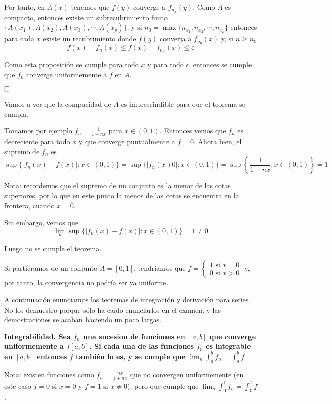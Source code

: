 \documentclass[a4paper]{article}
\newcommand{\qed}{\begin{flushright}
		{$\newline\square$}
	\end{flushright}}
\begin{document}
Por tanto, en $A(x)$ tenemos que $f(y)$ converge a $f_{n_x}(y)$. Como $A$ es compacto, entonces existe un subrecubrimiento finito $\{A(x_1), A(x_2), A(x_3),\cdots , A(x_p) \}$, y si $n_0 = \max\{ n_{x_1},n_{x_2},\cdots,n_{x_p} \}$ entonces para cada $x$ existe un recubrimiento donde $f(y)$ converja a $f_{n_0}(x)$ y, si $n\ge n_0$
$$f(x)-f_n(x) \le f(x)-f_{n_0}(x) \le \varepsilon$$

Como esta proposición se cumple para todo $x$ y para todo $\epsilon$, entonces se cumple que $f_n$ converge uniformemente a $f$ en $A$.
\qed


Vamos a ver que la compacidad de $A$ es imprescindible para que el teorema se cumpla.

Tomamos por ejemplo $f_n = \frac{1}{1+nx}$ para $x\in(0,1)$. Entonces vemos que $f_n$ es decreciente para todo $x$ y que converge puntualmente a $f = 0$.  Ahora bien, el supremo de $f_n$ es 
$$\sup\{|f_n(x) - f(x)|:x\in(0,1)\} = \sup\{|f_n(x) 0|:x\in(0,1)\} = \sup\left\lbrace \frac{1}{1+nx} :x\in(0,1)\right\rbrace = 1$$

Nota: recordemos que el supremo de un conjunto es la menor de las cotas superiores, por lo que en este punto la menos de las cotas se encuentra en la frontera, cuando $x = 0$.

Sin embargo, vemos que 
$$\lim_n\sup\{|f_n(x) - f(x)|:x\in(0,1)\} = 1 \neq 0$$

Luego no se cumple el teorema.

Si partiéramos de un conjunto $A = [0,1]$, tendríamos que $f = \begin{cases}
1 \text{ si } x = 0 \\ 0 \text{ si } x>0
\end{cases}$ y, por tanto, la convergencia no podría ser ya uniforme.


A continuación enunciamos los teoremas de integración y derivación para series. No los demuestro porque sólo ha caído enunciarlos en el examen, y las demostraciones se acaban haciendo un poco largas.

\textbf{Integrabilidad. Sea $f_n$ una sucesion de funciones en $[a,b]$ que converge uniformemente a $f[a,b]$. Si cada una de las funciones $f_n$ es integrable en $[a,b]$ entonces $f$ también lo es, y se cumple que $\lim_n \int^b_af_n = \int^b_a f$}

Nota: existen funciones como $f_n = \frac{nx}{1+nx}$ que no convergen uniformemente (en este caso $f = 0$ si $x = 0$ y $f = 1$ si $x\neq0$), pero que cumple que $\lim_n \int^1_0f_n = \int^1_0 f$.
\end{document}
